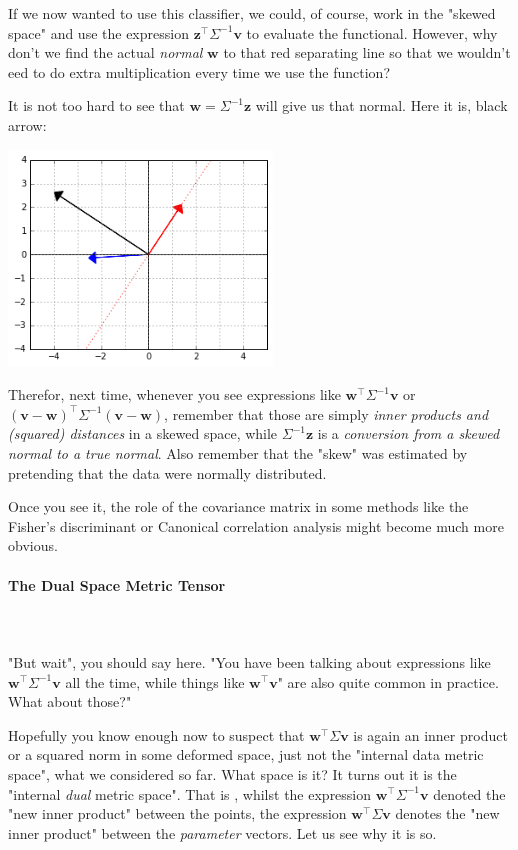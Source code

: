 \documentclass{article}
\begin{document}
If we now wanted to use this classifier, we could, of course, work in the "skewed space" and use the expression $\bm{z}^{\intercal}\Sigma^{-1}\bm{v}$ to evaluate the functional. However, why don't we find the actual \textit{normal} $\bm{w}$ to that red separating line so that we wouldn't eed to do extra multiplication every time we use the function?\medskip

It is not too hard to see that $\bm{w} = \Sigma^{-1}\bm{z}$ will give us that normal. Here it is, black arrow:\medskip

\begin{center}
  \includegraphics[width=7cm]{figs_hints_8.png}
\end{center}

Therefor, next time, whenever you see expressions like $\bm{w}^{\intercal}\Sigma^{-1}\bm{v}$ or $(\bm{v}-\bm{w})^{\intercal}\Sigma^{-1}(\bm{v}-\bm{w})$, remember that those are simply \textit{inner products and (squared) distances} in a skewed space, while $\Sigma^{-1}\bm{z}$ is a \textit{conversion from a skewed normal to a true normal}. Also remember that the "skew" was estimated by pretending that the data were normally distributed.\medskip 

Once you see it, the role of the covariance matrix in some methods like the Fisher's discriminant or Canonical correlation analysis might become much more obvious.

\paragraph{The Dual Space Metric Tensor}\mbox{}\\\\
"But wait", you should say here. "You have been talking about expressions like $\bm{w}^{\intercal}\Sigma^{-1}\bm{v}$ all the time, while things like $\bm{w}^{\intercal}\bm{v}$" are also quite common in practice. What about those?"\medskip

Hopefully you know enough now to suspect that $\bm{w}^{\intercal}\Sigma\bm{v}$ is again an inner product or a squared norm in some deformed space, just not the "internal data metric space", what we considered so far. What space is it? It turns out it is the "internal \textit{dual} metric space". That is , whilst the expression $\bm{w}^{\intercal}\Sigma^{-1}\bm{v}$ denoted the "new inner product" between the points, the expression $\bm{w}^{\intercal}\Sigma\bm{v}$ denotes the "new inner product" between the \textit{parameter} vectors. Let us see why it is so.\medskip
\end{document}
